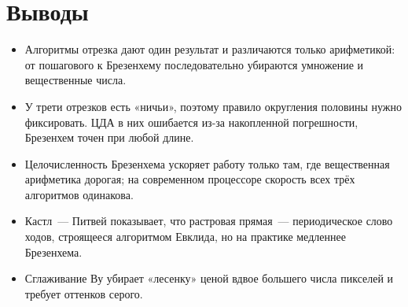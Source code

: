 \documentclass[11pt,a4paper]{article}
\begin{document}
\section{Выводы}
\begin{itemize}[label=--, leftmargin=1.5em, itemsep=0.2em, topsep=0.2em]
  \item Алгоритмы отрезка дают один результат и различаются только
        арифметикой: от пошагового к Брезенхему последовательно убираются
        умножение и вещественные числа.
  \item У трети отрезков есть «ничьи», поэтому правило округления половины
        нужно фиксировать. ЦДА в них ошибается из-за накопленной погрешности,
        Брезенхем точен при любой длине.
  \item Целочисленность Брезенхема ускоряет работу только там, где
        вещественная арифметика дорогая; на современном процессоре скорость
        всех трёх алгоритмов одинакова.
  \item Кастл~— Питвей показывает, что растровая прямая~— периодическое слово
        ходов, строящееся алгоритмом Евклида, но на практике медленнее Брезенхема.
  \item Сглаживание Ву убирает «лесенку» ценой вдвое большего числа пикселей и
        требует оттенков серого.
\end{itemize}
\end{document}

